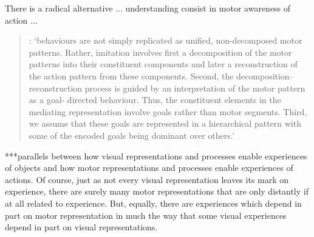 \documentclass[12pt,\papersize]{extarticle}
\begin{document}

There is a radical alternative ... understanding consist in motor awareness of action ...
\begin{quote}
\citep[p.\ 154]{bekkering:2000_imitation}: `behaviours are not simply replicated as unified, non-decomposed motor patterns. Rather, imitation involves first a decomposition of the motor patterns into their constituent components and later a reconstruction of the action pattern from these components. Second, the decomposition--reconstruction process is guided by an interpretation of the motor pattern as a goal- directed behaviour. Thus, the constituent elements in the mediating representation involve goals rather than motor segments. Third, we assume that these goals are represented in a hierarchical pattern with some of the encoded goals being dominant over others.' 
\end{quote}

***parallels between how visual representations and processes enable experiences of objects and how motor representations and processes enable experiences of actions. Of course, just as not every visual representation leaves its mark on experience, there are surely many motor representations that are only distantly if at all related to experience. But, equally, there are experiences which depend in part on motor representation in much the way that some visual experiences depend in part on visual representations.
\end{document}
